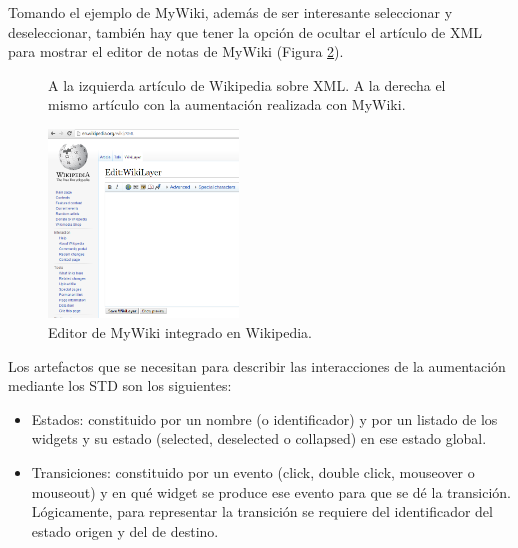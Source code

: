 Tomando el ejemplo de MyWiki, además de ser interesante seleccionar y deseleccionar, también hay que tener la opción de ocultar el artículo de XML para mostrar el editor de notas de MyWiki (Figura \ref{fig:MyWikiEditor}).

\begin{figure}
\begin{center}
\caption{A la izquierda artículo de Wikipedia sobre XML. A la derecha el mismo artículo con la aumentación realizada con MyWiki.}
\label{fig:MyWikiAugmentation}
\end{center}
\end{figure}

\begin{figure}
\begin{center}
\includegraphics[width=0.45\textwidth]{figs/4-MyWikiEditor.png}
\caption{Editor de MyWiki integrado en Wikipedia.}
\label{fig:MyWikiEditor}
\end{center}
\end{figure}

Los artefactos que se necesitan para describir las interacciones de la aumentación mediante los STD son los siguientes:
\begin{itemize}
\item{Estados: constituido por un nombre (o identificador) y por un listado de los widgets y su estado (selected, deselected o collapsed) en ese estado global.}
\item{Transiciones: constituido por un evento (click, double click, mouseover o mouseout) y en qué widget se produce ese evento para que se dé la transición. Lógicamente, para representar la transición se requiere del identificador del estado origen y del de destino.}
\end{itemize}

